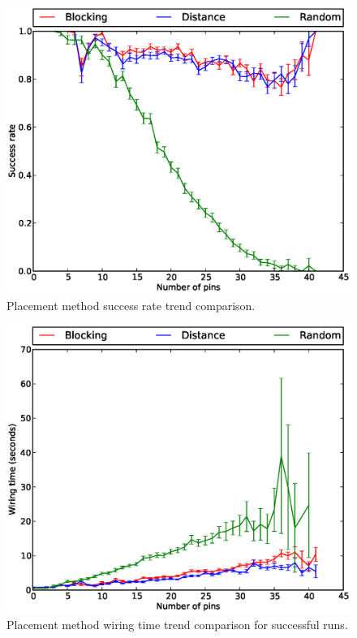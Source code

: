 \begin{figure}[H]
\begin{center}
\includegraphics[width=\textwidth]{Images/placement_success_trend_comparison.eps}
\caption[Placement method success rate trend comparison]{Placement method
success rate trend comparison.}
\label{fig:placement_success_trend}
\end{center}
\end{figure}

\begin{figure}[H]
\begin{center}
\includegraphics[width=\textwidth]{Images/placement_time_trend_comparison.eps}
\caption[Placement method wiring time trend comparison]{Placement method wiring
time trend comparison for successful runs.}
\label{fig:placement_time_trend}
\end{center}
\end{figure}

